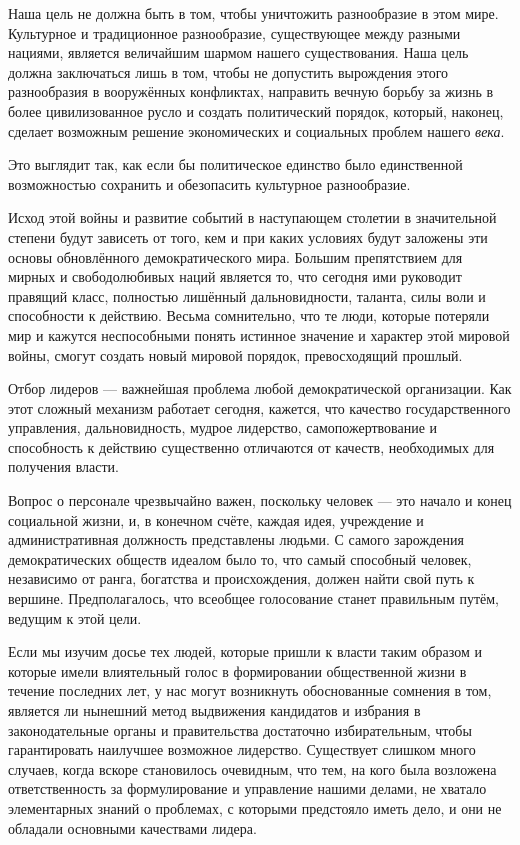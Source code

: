 Наша цель не должна быть в том, чтобы уничтожить разнообразие в этом мире. Культурное и традиционное разнообразие, существующее между разными нациями, является величайшим шармом нашего существования. Наша цель должна заключаться лишь в том, чтобы не допустить вырождения этого разнообразия в вооружённых конфликтах, направить вечную борьбу за жизнь в более цивилизованное русло и создать политический порядок, который, наконец, сделает возможным решение экономических и социальных проблем нашего \textit{века}.
 
Это выглядит так, как если бы политическое единство было единственной возможностью сохранить и обезопасить культурное разнообразие.

Исход этой войны и развитие событий в наступающем столетии в значительной степени будут зависеть от того, кем и при каких условиях будут заложены эти основы обновлённого демократического мира. Большим препятствием для мирных и свободолюбивых наций является то, что сегодня ими руководит правящий класс, полностью лишённый дальновидности, таланта, силы воли и способности к действию. Весьма сомнительно, что те люди, которые потеряли мир и кажутся неспособными понять истинное значение и характер этой мировой войны, смогут создать новый мировой порядок, превосходящий прошлый.
 
Отбор лидеров — важнейшая проблема любой демократической организации. Как этот сложный механизм работает сегодня, кажется, что качество государственного управления, дальновидность, мудрое лидерство, самопожертвование и способность к действию существенно отличаются от качеств, необходимых для получения власти.

Вопрос о персонале чрезвычайно важен, поскольку человек — это начало и конец социальной жизни, и, в конечном счёте, каждая идея, учреждение и административная должность представлены людьми. С самого зарождения демократических обществ идеалом было то, что самый способный человек, независимо от ранга, богатства и происхождения, должен найти свой путь к вершине. Предполагалось, что всеобщее голосование станет правильным путём, ведущим к этой цели.
 
Если мы изучим досье тех людей, которые пришли к власти таким образом и которые имели влиятельный голос в формировании общественной жизни в течение последних лет, у нас могут возникнуть обоснованные сомнения в том, является ли нынешний метод выдвижения кандидатов и избрания в законодательные органы и правительства достаточно избирательным, чтобы гарантировать наилучшее возможное лидерство. Существует слишком много случаев, когда вскоре становилось очевидным, что тем, на кого была возложена ответственность за формулирование и управление нашими делами, не хватало элементарных знаний о проблемах, с которыми предстояло иметь дело, и они не обладали основными качествами лидера.

